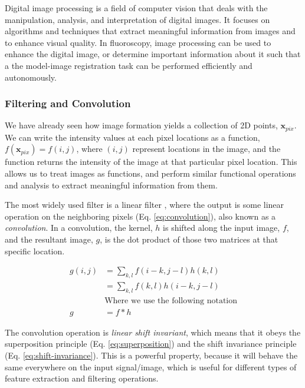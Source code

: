 Digital image processing is a field of computer vision that deals with the manipulation, analysis, and interpretation of digital images. It focuses on algorithms and techniques that extract meaningful information from images and to enhance visual quality. In fluoroscopy, image processing can be used to enhance the digital image, or determine important information about it such that a the model-image registration task can be performed efficiently and autonomously.

\subsubsection{Filtering and Convolution}
We have already seen how image formation yields a collection of 2D points, $\mathbf{x}_{pix}$. We can write the intensity values at each pixel locations as a function, $f(\mathbf{x}_{pix}) = f(i,j)$, where $(i,j)$ represent locations in the image, and the function returns the intensity of the image at that particular pixel location. This allows us to treat images as functions, and perform similar functional operations and analysis to extract meaningful information from them.

The most widely used filter is a linear filter \cite{szeliskiComputerVisionAlgorithms2022}, where the output is some linear operation on the neighboring pixels (Eq. \ref{eq:convolution}), also known as a \emph{convolution}. In a convolution, the kernel, $h$ is shifted along the input image, $f$, and the resultant image, $g$, is the dot product of those two matrices at that specific location.

\begin{equation}
    \begin{aligned}
        g(i,j) &= \sum_{k,l}f(i-k,j-l)h(k,l) \\
        &= \sum_{k,l}f(k,l)h(i-k,j-l) \\
        &\text{Where we use the following notation}\\
        g&= f * h
    \end{aligned}
    \label{eq:convolution}
\end{equation}

The convolution operation is \emph{linear shift invariant}, which means that it obeys the superposition principle (Eq. \ref{eq:superposition}) and the shift invariance principle (Eq. \ref{eq:shift-invariance}). This is a powerful property, because it will behave the same everywhere on the input signal/image, which is useful for different types of feature extraction and filtering operations.

